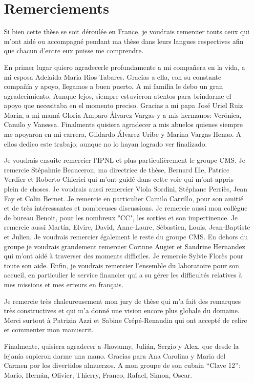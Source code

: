 \begingroup
\let\clearpage\relax
\let\cleardoublepage\relax
\let\cleardoublepage\relax


\begin{otherlanguage}{francais}
\chapter*{Remerciements}

Si bien cette thèse se soit déroulée en France, je voudrais remercier touts ceux qui m'ont aidé ou accompagné pendant ma thèse dans leurs langues respectives afin que chacun d'entre eux puisse me comprendre. 

En primer lugar quiero agradecerle profundamente a mi compañera en la vida, a mi esposa Adelaida Maria Rios Tabares. Gracias a ella, con su constante compañía y apoyo, llegamos a buen puerto. A mi familia le debo un gran agradecimiento. Aunque lejos, siempre estuvieron atentos para brindarme el apoyo que necesitaba en el momento preciso. Gracias a mi papa José Uriel Ruiz Marín, a mi mamá Gloria Amparo Álvarez Vargas y a mis hermanos: Verónica, Camilo y Vanessa. Finalmente quisiera agradecer a mis abuelos quienes siempre me apoyaron en mi carrera, Gildardo Álvarez Uribe y Marina Vargas Henao. A ellos dedico este trabajo, aunque no lo hayan logrado ver finalizado.

Je voudrais ensuite remercier l'IPNL et plus particulièrement le groupe CMS. Je remercie Stépahnie Beauceron, ma directrice de thèse, Bernard Ille, Patrice Verdier et Roberto Chierici qui m'ont guidé dans cette voie qui m'ont appris plein de choses. Je voudrais aussi remercier Viola Sordini, Stéphane Perriès, Jean Fay et Colin Bernet. Je remercie en particulier Camilo Carrillo, pour son amitié et de très intéressantes et nombreuses discussions. Je remercie aussi mon collègue de bureau Benoit, pour les nombreux "CC", les sorties et son impertinence. Je remercie aussi Martín, Elvire, David, Anne-Laure, Sébastien, Louis, Jean-Baptiste et Julien. Je voudrais remercier également le reste du groupe CMS. En dehors du groupe je voudrais grandement remercier Corinne Augier et Sandrine Hernandez qui m'ont aidé à traverser des moments difficiles. Je remercie Sylvie Florès pour toute son aide. Enfin, je voudrais remercier l'ensemble du laboratoire pour son accueil, en particulier le service financier qui a su gérer les difficultés relatives à mes missions et mes erreurs en français.  

Je remercie très chaleureusement mon jury de thèse qui m'a fait des remarques très constructives et qui m'a donné une vision encore plus globale du domaine. Merci surtout à Patrizia Azzi et Sabine Crépé-Renaudin qui ont accepté de relire et commenter mon manuscrit. 

Finalmente, quisiera agradecer a Jhovanny, Julián, Sergio y Alex, que desde la lejanía supieron darme una mano. Gracias para Ana Carolina y Maria del Carmen por los divertidos almuerzos. A mon groupe de son cubain ``Clave 12'': Mario, Hernán, Olivier, Thierry, Franco, Rafael, Simon, Oscar. 

\end{otherlanguage}

\endgroup
